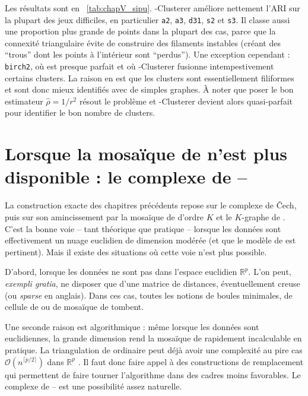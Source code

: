 Les résultats sont en \Tab~\ref{tab:chapV_sipu}. \HGP-Clusterer améliore nettement l'ARI sur la plupart des jeux difficiles, en particulier \texttt{a2}, \texttt{a3}, \texttt{d31}, \texttt{s2} et \texttt{s3}. Il classe aussi une proportion plus grande de points dans la plupart des cas, parce que la connexité triangulaire évite de construire des filaments instables (créant des ``trous'' dont les points à l'intérieur sont ``perdus''). Une exception cependant : \texttt{birch2}, où \HDBSCAN est presque parfait et où \HGP-Clusterer fusionne intempestivement certains clusters. La raison en est que les clusters sont essentiellement filiformes et sont donc mieux identifiés avec de simples graphes. À noter que poser le bon estimateur $\widehat\rho=1/r^2$ résout le problème et \HGP-Clusterer devient alors quasi-parfait pour identifier le bon nombre de clusters. %



\section{Lorsque la mosaïque de  n'est plus disponible : le complexe de --}
\label{sec:chapV_vietoris_rips}

La construction exacte des chapitres précédents repose sur le complexe de \v Cech, puis sur son amincissement par la mosaïque de  d'ordre $K$ et le $K$-graphe de . C'est la bonne voie -- tant théorique que pratique -- lorsque les données sont effectivement un nuage euclidien de dimension modérée (et que le modèle de  est pertinent). Mais il existe des situations où cette voie n'est plus possible.

D'abord, lorsque les données ne sont pas dans l'espace euclidien $\mathbb R^p$. L'on peut, \emph{exempli gratia}, ne disposer que d'une matrice de distances, éventuellement creuse (ou \emph{sparse} en anglais). 
Dans ces cas, toutes les notions de boules minimales, de cellule de  ou de mosaïque de  tombent.

Une seconde raison est algorithmique : même lorsque les données sont euclidiennes, la grande dimension rend la mosaïque de  rapidement incalculable en pratique. La triangulation de  ordinaire peut déjà avoir une complexité au pire cas $\mathcal O(n^{\lceil p/2\rceil})$ dans $\mathbb R^p$ \cite{BoissonnatChazalYvinec}. %
Il faut donc faire appel à des constructions de remplacement qui permettent de faire tourner l'algorithme dans des cadres moins favorables. Le complexe de -- est une possibilité assez naturelle.

